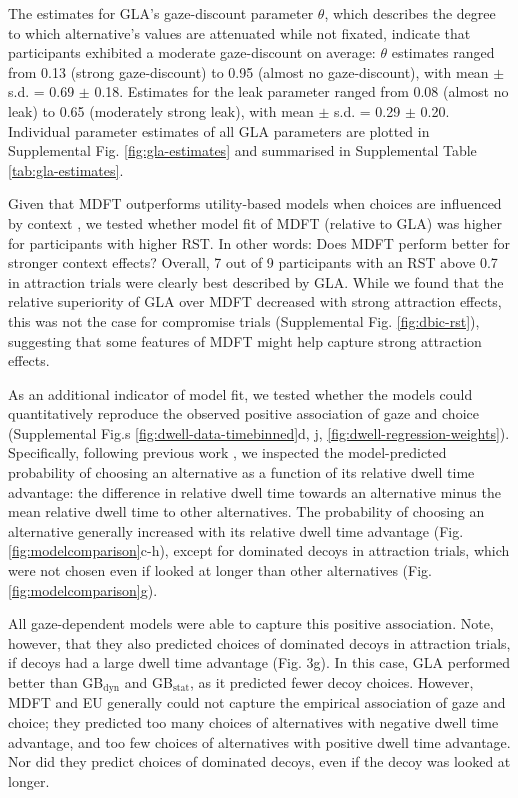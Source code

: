 \documentclass[11pt, a4paper]{article}
\begin{document}
The estimates for GLA’s gaze-discount parameter $\theta$, which describes the degree to which alternative’s values are attenuated while not fixated, indicate that participants exhibited a moderate gaze-discount on average: $\theta$ estimates ranged from 0.13 (strong gaze-discount) to 0.95 (almost no gaze-discount), with mean $\pm$ s.d. = 0.69 $\pm$ 0.18. Estimates for the leak parameter ranged from 0.08 (almost no leak) to 0.65 (moderately strong leak), with mean $\pm$ s.d. = 0.29 $\pm$ 0.20. Individual parameter estimates of all GLA parameters are plotted in Supplemental Fig. \ref{fig:gla-estimates} and summarised in Supplemental Table \ref{tab:gla-estimates}.

Given that MDFT outperforms utility-based models when choices are influenced by context \autocite{berkowitsch2014RigorouslyTestingMultialternative}, we tested whether model fit of MDFT (relative to GLA) was higher for participants with higher RST. In other words: Does MDFT perform better for stronger context effects? Overall, 7 out of 9 participants with an RST above 0.7 in attraction trials were clearly best described by GLA. While we found that the relative superiority of GLA over MDFT decreased with strong attraction effects, this was not the case for compromise trials (Supplemental Fig. \ref{fig:dbic-rst}), suggesting that some features of MDFT might help capture strong attraction effects.

As an additional indicator of model fit, we tested whether the models could quantitatively reproduce the observed positive association of gaze and choice (Supplemental Fig.s \ref{fig:dwell-data-timebinned}d, j, \ref{fig:dwell-regression-weights}). Specifically, following previous work \autocite{krajbich2010VisualFixationsComputation,krajbich2011MultialternativeDriftdiffusionModel}, we inspected the model-predicted probability of choosing an alternative as a function of its relative dwell time advantage: the difference in relative dwell time towards an alternative minus the mean relative dwell time to other alternatives. The probability of choosing an alternative generally increased with its relative dwell time advantage (Fig. \ref{fig:modelcomparison}c-h), except for dominated decoys in attraction trials, which were not chosen even if looked at longer than other alternatives (Fig. \ref{fig:modelcomparison}g).

All gaze-dependent models were able to capture this positive association. Note, however, that they also predicted choices of dominated decoys in attraction trials, if decoys had a large dwell time advantage (Fig. 3g). In this case, GLA performed better than GB$_{\text{dyn}}$ and GB$_{\text{stat}}$, as it predicted fewer decoy choices. However, MDFT and EU generally could not capture the empirical association of gaze and choice; they predicted too many choices of alternatives with negative dwell time advantage, and too few choices of alternatives with positive dwell time advantage. 
Nor did they predict choices of dominated decoys, even if the decoy was looked at longer.
\end{document}
